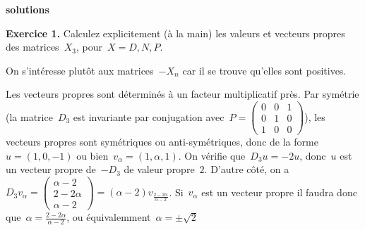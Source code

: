 \clearpage
{\bf\large solutions}


{\color{blue}
{\bf Exercice 1.}
Calculez explicitement (à la main) les valeurs et vecteurs propres des
matrices~$X_3$, pour~$X=D,N,P$.
}

On s'intéresse plutôt aux matrices~$-X_n$ car il se trouve qu'elles sont
positives.


Les vecteurs propres %
sont déterminés à un
facteur multiplicatif près.  Par symétrie (la matrice~$D_3$ est invariante par
conjugation
avec~$P=\left(\begin{smallmatrix}0&0&1\\0&1&0\\1&0&0\end{smallmatrix}\right)$),
les vecteurs propres sont symétriques ou anti-symétriques, donc de la
forme~$u=(1,0,-1)$ ou bien~$v_\alpha=(1,\alpha,1)$.  On vérifie que~$D_3u=-2u$,
donc~$u$ est un vecteur propre de~$-D_3$ de valeur propre~$2$.   D'autre côté,
on a~$D_3
v_\alpha
=
\left(\begin{smallmatrix}\alpha-2\\2-2\alpha\\\alpha-2\end{smallmatrix}\right)
=
(\alpha-2)
v_\frac{2-2\alpha}{\alpha-2}
$.  Si~$v_\alpha$ est un vecteur propre il faudra donc
que~$\alpha=\frac{2-2\alpha}{\alpha-2}$, ou équivalemment~$\alpha=\pm\sqrt 2$
